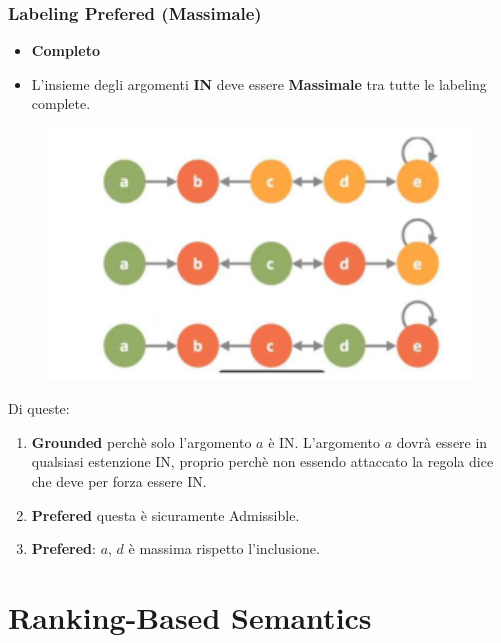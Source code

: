 \subsection{Labeling Prefered (Massimale)}
\begin{itemize}
    \item \textbf{Completo}
    \item L’insieme degli argomenti \textbf{IN} deve essere \textbf{Massimale} tra tutte le labeling complete.
\end{itemize}
\begin{figure}[htp]
	\centering
    \includegraphics[width=12cm, keepaspectratio]{img/Cap7/GR.png}
\end{figure}
Di queste:
\begin{enumerate}
    \item \textbf{Grounded} perchè solo l’argomento $a$ è IN. L’argomento $a$ dovrà essere in qualsiasi estenzione IN, proprio perchè non essendo attaccato la regola dice che deve per forza essere IN.
    \item \textbf{Prefered} questa è sicuramente Admissible.
    \item \textbf{Prefered}: $a$, $d$ è massima rispetto l’inclusione.
\end{enumerate}
\chapter{Ranking-Based Semantics} \label{Ranking-Based Semantics}
